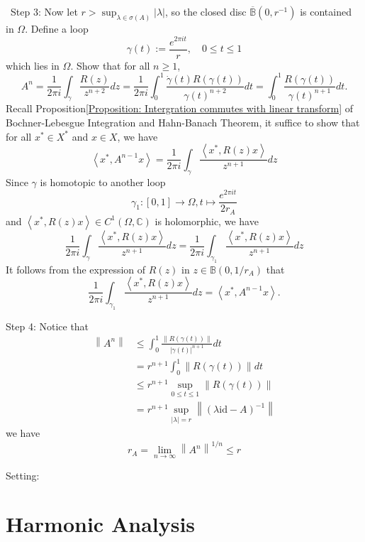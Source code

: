 \documentclass[12pt,a4paper]{book}
\newenvironment{prooff}{{\noindent\it\textcolor{cyan!40!black}{Proof}:}\,}{\par}
\newcommand{\bb}[1]{\mathbb{#1}}
\theoremstyle{definition}
\begin{document}
\begin{prooff}
    Step 3: Now let $r>\sup _{\lambda \in \sigma(A)}|\lambda|$, 
    so the closed disc $\overline{\bb{B}}(0,r^{-1})$
    is contained in $\Omega$. Define a loop 
$$
\gamma(t):=\frac{e^{2 \pi i t}}{r}, \quad 0 \leq t \leq 1
$$ which lies in $\Omega$. Show that for all $n\ge 1$, 
$$
A^n=\frac{1}{2 \pi i} \int_\gamma \frac{R(z)}{z^{n+2}} d z=\frac{1}{2 \pi i} \int_0^1 \frac{\dot{\gamma}(t) R(\gamma(t))}{\gamma(t)^{n+2}} d t=\int_0^1 \frac{R(\gamma(t))}{\gamma(t)^{n+1}} d t.
$$
Recall Proposition\ref{Proposition: Intergration commutes with linear transform} 
of Bochner-Lebesgue Integration and Hahn-Banach Theorem, it suffice to show that for all $x^*\in X^*$ and $x\in X$, we have 
\begin{equation*}
\left\langle x^*, A^{n-1} x\right\rangle=
\frac{1}{2 \pi i} \int_\gamma \frac{\left\langle x^*, R(z) x\right\rangle}{z^{n+1}} d z
\end{equation*}  
Since $\gamma$ is homotopic to another 
loop $$\gamma_1: [0,1]\rightarrow \Omega, t\mapsto \frac{e^{2\pi i t}}{2r_A}$$
and $\left\langle x^*, R(z) x\right\rangle\in C^1(\Omega,\bb{C})$ is holomorphic, we have  
\begin{equation*}
    \frac{1}{2 \pi i} \int_{\gamma} \frac{\left\langle x^*, R(z) x\right\rangle}{z^{n+1}} d z=\frac{1}{2 \pi i} \int_{\gamma_1} \frac{\left\langle x^*, R(z) x\right\rangle}{z^{n+1}} d z 
\end{equation*}
It follows from the expression of $R(z)$ in $z\in \bb{B}(0,1/r_A)$ that 
\begin{equation*}
    \frac{1}{2 \pi i} \int_{\gamma_1} \frac{\left\langle x^*, R(z) x\right\rangle}{z^{n+1}} d z = \left\langle x^*, A^{n-1} x\right\rangle. 
\end{equation*}

Step 4: Notice that 
$$
\begin{aligned}
\left\|A^n\right\| & \leq \int_0^1 \frac{\|R(\gamma(t))\|}{|\gamma(t)|^{n+1}} d t \\
& =r^{n+1} \int_0^1\|R(\gamma(t))\| d t \\
& \leq r^{n+1} \sup _{0 \leq t \leq 1}\|R(\gamma(t))\| \\
& =r^{n+1} \sup _{|\lambda|=r}\left\|(\lambda \text{id}-A)^{-1}\right\|
\end{aligned}
$$
we have 
$$
r_A=\lim _{n \rightarrow \infty}\left\|A^n\right\|^{1 / n} \leq r
$$
\end{prooff}
Setting: 




\chapter{Harmonic Analysis}
\end{document}
